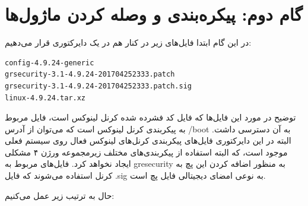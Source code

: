 \documentclass{article}
\begin{document}
\section*{گام دوم: پیکره‌بندی و وصله کردن ماژول‌ها}

در این گام ابتدا فایل‌های زیر در کنار هم در یک دایرکتوری قرار می‌دهیم:

\begin{latin}
\begin{verbatim}
config-4.9.24-generic
grsecurity-3.1-4.9.24-201704252333.patch
grsecurity-3.1-4.9.24-201704252333.patch.sig
linux-4.9.24.tar.xz
\end{verbatim}
\end{latin}
توضیح در مورد این فایل‌‌ها که فایل  کد فشرده شده کرنل لینوکس است، فایل  مربوط به پیکربندی کرنل لینوکس است که می‌توان از آدرس /boot به آن دسترسی داشت. البته در این دایرکتوری فایل‌های پیکربندی کرنل‌های لینوکس فعال روی سیستم فعلی موجود است، که البته استفاده از پیکربندی‌های مختلف زیرمجموعه ورژن ۴ مشکلی ایجاد نخواهد کرد. فایل‌های مربوط به gresecurity به منظور اضافه کردن این پچ به کرنل استفاده می‌شوند که فایل .sig به نوعی امضای دیجیتالی فایل پچ است. 

حال به ترتیب زیر عمل می‌کنیم:
\end{document}
